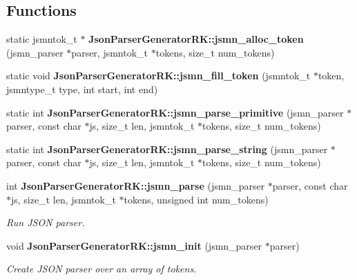 \subsection*{Functions}
\begin{DoxyCompactItemize}
\item 
static jsmntok\+\_\+t $\ast$ \textbf{ Json\+Parser\+Generator\+R\+K\+::jsmn\+\_\+alloc\+\_\+token} (jsmn\+\_\+parser $\ast$parser, jsmntok\+\_\+t $\ast$tokens, size\+\_\+t num\+\_\+tokens)
\item 
static void \textbf{ Json\+Parser\+Generator\+R\+K\+::jsmn\+\_\+fill\+\_\+token} (jsmntok\+\_\+t $\ast$token, jsmntype\+\_\+t type, int start, int end)
\item 
static int \textbf{ Json\+Parser\+Generator\+R\+K\+::jsmn\+\_\+parse\+\_\+primitive} (jsmn\+\_\+parser $\ast$parser, const char $\ast$js, size\+\_\+t len, jsmntok\+\_\+t $\ast$tokens, size\+\_\+t num\+\_\+tokens)
\item 
static int \textbf{ Json\+Parser\+Generator\+R\+K\+::jsmn\+\_\+parse\+\_\+string} (jsmn\+\_\+parser $\ast$parser, const char $\ast$js, size\+\_\+t len, jsmntok\+\_\+t $\ast$tokens, size\+\_\+t num\+\_\+tokens)
\item 
int \textbf{ Json\+Parser\+Generator\+R\+K\+::jsmn\+\_\+parse} (jsmn\+\_\+parser $\ast$parser, const char $\ast$js, size\+\_\+t len, jsmntok\+\_\+t $\ast$tokens, unsigned int num\+\_\+tokens)
\begin{DoxyCompactList}\small\item\em Run J\+S\+ON parser. \end{DoxyCompactList}\item 
void \textbf{ Json\+Parser\+Generator\+R\+K\+::jsmn\+\_\+init} (jsmn\+\_\+parser $\ast$parser)
\begin{DoxyCompactList}\small\item\em Create J\+S\+ON parser over an array of tokens. \end{DoxyCompactList}\end{DoxyCompactItemize}
